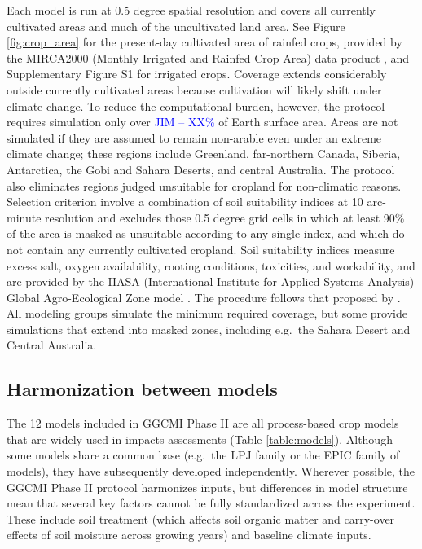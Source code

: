 \documentclass[gmd, manuscript]{copernicus} %
\begin{document}
Each model is run at 0.5 degree spatial resolution and covers all currently cultivated areas and much of the uncultivated land area. See Figure \ref{fig:crop_area} for the present-day cultivated area of rainfed crops, provided by the MIRCA2000 (Monthly Irrigated and Rainfed Crop Area) data product \citep{Portmann2010}, and Supplementary Figure S1 for irrigated crops. 
Coverage extends considerably outside currently cultivated areas because cultivation will likely shift under climate change.  
To reduce the computational burden, however, the protocol requires simulation only over \textcolor{blue}{JIM -- XX\%} of Earth surface area.  
Areas are not simulated if they are assumed to remain non-arable even under an extreme climate change; these regions include Greenland, far-northern Canada, Siberia, Antarctica, the Gobi and Sahara Deserts, and central Australia. 
The protocol also eliminates regions judged unsuitable for cropland for non-climatic reasons. 
Selection criterion involve a combination of soil suitability indices at 10 arc-minute resolution and excludes those 0.5 degree grid cells in which at least 90\% of the area is masked as unsuitable according to any single index, and which do not contain any currently cultivated cropland. 
Soil suitability indices measure excess salt, oxygen availability, rooting conditions, toxicities, and workability, and are provided by the IIASA (International Institute for Applied Systems Analysis) Global Agro-Ecological Zone model \citep[GAEZ, ][]{gaez}. 
The procedure follows that proposed by \citet{pugh_climate_2016}. 
All modeling groups simulate the minimum required coverage, but some provide simulations that extend into masked zones, including e.g.\ the Sahara Desert and Central Australia.

\subsection{Harmonization between models}
The 12 models included in GGCMI Phase II are all process-based crop models that are widely used in impacts assessments (Table \ref{table:models}).
Although some models share a common base (e.g.\ the LPJ family or the EPIC family of models), they have subsequently developed independently.  
Wherever possible, the GGCMI Phase II protocol harmonizes inputs, but
differences in model structure mean that several key factors cannot be fully standardized across the experiment. These include soil treatment (which affects soil organic matter and carry-over effects of soil moisture across growing years) and baseline climate inputs.  
\end{document}
